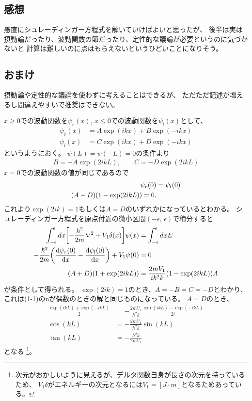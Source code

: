 \documentclass[../../master.tex]{subfiles}
\begin{document}
\subsection*{感想}
愚直にシュレーディンガー方程式を解いていけばよいと思ったが、
後半は実は摂動論だったり、波動関数の節だったり、定性的な議論が必要というのに気づかないと
計算は難しいのに点はもらえないというひどいことになりそう。

\subsection*{おまけ}
摂動論や定性的な議論を使わずに考えることはできるが、
ただただ記述が増えるし間違えやすいで推奨はできない。

\(x\ge 0\)での波動関数を\(\psi_r(x)\), \(x\le 0\)での波動関数を\(\psi_l(x)\)として、
\begin{align}
    \psi_r(x)&=A\exp(ikx) + B\exp(-ikx)\\
    \psi_l(x)&=C\exp(ikx) + D\exp(-ikx)
\end{align}
というようにおく。
\(\psi(L)=\psi(-L)=0\)の条件より
\begin{align}
    B = -A\exp(2ikL),\qquad C = -D\exp(2ikL)
\end{align}
\(x=0\)での波動関数の値が同じであるので
\begin{align}
    \psi_r(0) &= \psi_l(0)\\
    (A-D)\qty(1-\exp(2ikL)) = 0.
\end{align}
これより\(\exp(2ik)=1\)もしくは\(A=D\)のいずれかになっているとわかる。
シュレーディンガー方程式を原点付近の微小区間\((-\epsilon,\,\epsilon)\)で積分すると
\begin{align}
    \int_{-\epsilon}^{\epsilon} dx \qty[-\frac{\hbar^2}{2m}\nabla^2 + V_1\delta(x)]\psi(x)
    &= \int_{-\epsilon}^{\epsilon} dx E\\
    -\frac{\hbar^2}{2m}\qty(\dv{\psi_r(0)}{x}-\dv{\psi_l(0)}{x}) + V_1 \psi(0) &= 0\\
    (A+D)\qty(1+\exp(2ikL))
    &=\frac{2mV_1}{i\hbar^2 k}\qty(1-\exp(2ikL))A
\end{align}
が条件として得られる。
\(\exp(2ik)=1\)のとき、\(A=-B=C=-D\)とわかり、これは(1-1)のnが偶数のときの解と同じものになっている。
\(A=D\)のとき、
\begin{align}
    \frac{\exp(ikL) + \exp(-ikL)}{2} &= -\frac{2mV_1}{\hbar^2 k} \frac{\exp(ikL)-\exp(-ikL)}{2i}\\
    \cos(kL) &= -\frac{2mV_1}{\hbar^2 k} \sin(kL)\\
    \tan(kL)&=-\frac{\hbar^2 k}{2mV_1}
\end{align}
となる
\footnote{次元がおかしいように見えるが、デルタ関数自身が長さの次元を持っているため、
\(V_1\delta\)がエネルギーの次元となるには\(V_1= [J\cdot m]\)となるためあっている。}。
\end{document}
